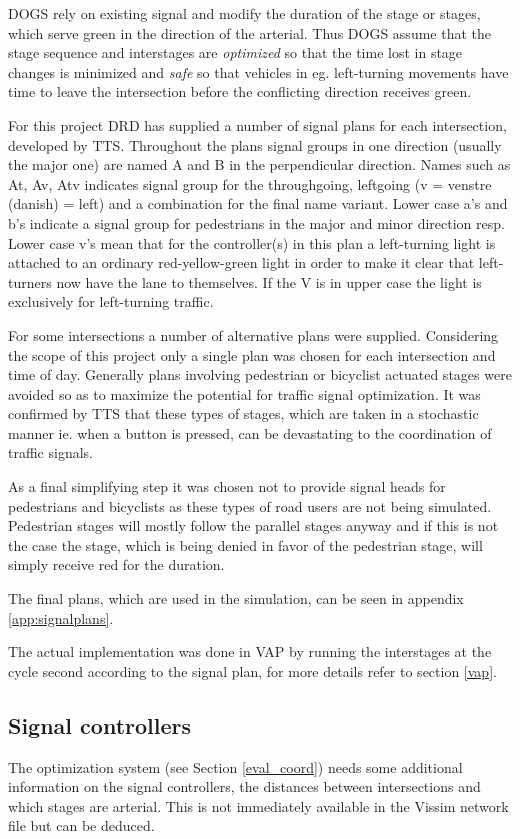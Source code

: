 DOGS rely on existing signal and modify the duration of the stage or stages, which serve green in the direction of the arterial. Thus DOGS assume that the stage sequence and interstages are \textit{optimized} so that the time lost in stage changes is minimized and \textit{safe} so that vehicles in eg. left-turning movements have time to leave the intersection before the conflicting direction receives green.

For this project DRD has supplied a number of signal plans for each intersection, developed by TTS. Throughout the plans signal groups in one direction (usually the major one) are named A and B in the perpendicular direction. Names such as At, Av, Atv indicates signal group for the throughgoing, leftgoing (v = venstre (danish) = left) and a combination for the final name variant. Lower case a's and b's indicate a signal group for pedestrians in the major and minor direction resp. Lower case v's mean that for the controller(s) in this plan a left-turning light is attached to an ordinary red-yellow-green light in order to make it clear that left-turners now have the lane to themselves. If the V is in upper case the light is exclusively for left-turning traffic.

For some intersections a number of alternative plans were supplied. Considering the scope of this project only a single plan was chosen for each intersection and time of day. Generally plans involving pedestrian or bicyclist actuated stages were avoided so as to maximize the potential for traffic signal optimization. It was confirmed by TTS that these types of stages, which are taken in a stochastic manner ie. when a button is pressed, can be devastating to the coordination of traffic signals.

As a final simplifying step it was chosen not to provide signal heads for pedestrians and bicyclists as these types of road users are not being simulated. Pedestrian stages will mostly follow the parallel stages anyway and if this is not the case the stage, which is being denied in favor of the pedestrian stage, will simply receive red for the duration.

The final plans, which are used in the simulation, can be seen in appendix \ref{app:signalplans}.

The actual implementation was done in VAP by running the interstages at the cycle second according to the signal plan, for more details refer to section \ref{vap}.

\subsection{Signal controllers}
\label{signal_details}
The optimization system (see Section \ref{eval_coord}) needs some additional information on the signal controllers, the distances between intersections and which stages are arterial. This is not immediately available in the Vissim network file but can be deduced.

